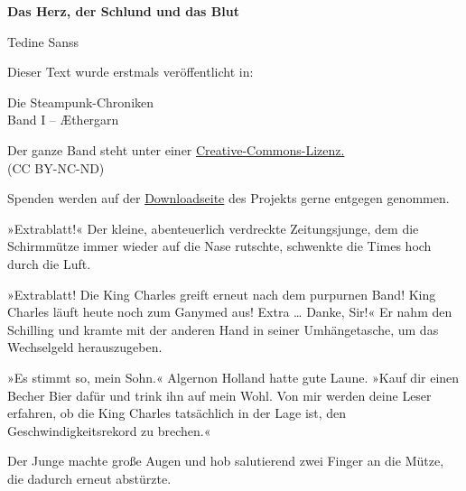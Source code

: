 \usepackage[ngerman]{babel}
\usepackage[T1]{fontenc}




\newcommand\bigpar\medskip


\raggedbottom
\begin{center}
\textbf{\huge\textsf{Das Herz, der Schlund und das Blut}}

\medskip
Tedine Sanss

\end{center}

\bigskip

\begin{flushleft}
Dieser Text wurde erstmals veröffentlicht in:
\begin{center}
Die Steampunk-Chroniken\\
Band I -- Æthergarn
\end{center}

\bigskip

Der ganze Band steht unter einer 
\href{http://creativecommons.org/licenses/by-nc-nd/2.0/de/}{Creative-Commons-Lizenz.} \\ 
(CC BY-NC-ND)

\bigskip

Spenden werden auf der 
\href{http://steampunk-chroniken.de/download}{Downloadseite}
des Projekts gerne entgegen genommen. 
\end{flushleft}

\newpage

»Extrablatt!« Der kleine, abenteuerlich verdreckte Zeitungsjunge,
dem die Schirmmütze immer wieder auf die Nase rutschte, schwenkte
die Times hoch durch die Luft.

»Extrablatt! Die King Charles greift erneut nach dem purpurnen
Band! King Charles läuft heute noch zum Ganymed aus! Extra \ldots{}
Danke, Sir!« Er nahm den Schilling und kramte mit der anderen Hand
in seiner Umhängetasche, um das Wechselgeld herauszugeben.

\bigpar

»Es stimmt so, mein Sohn.« Algernon Holland hatte gute Laune. »Kauf
dir einen Becher Bier dafür und trink ihn auf mein Wohl. Von mir
werden deine Leser erfahren, ob die King Charles tatsächlich in der
Lage ist, den Geschwindigkeitsrekord zu brechen.«

Der Junge machte große Augen und hob salutierend zwei Finger an die
Mütze, die dadurch erneut abstürzte.

